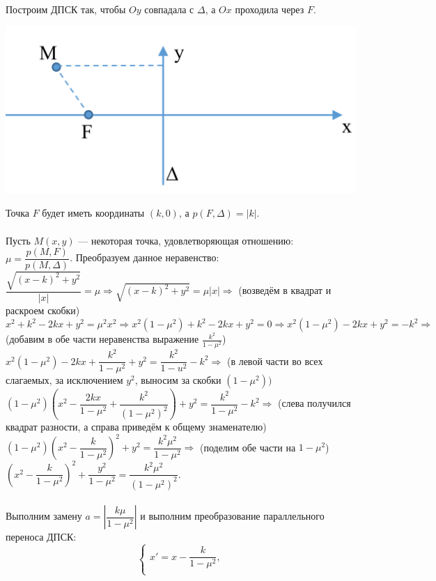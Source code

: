 \begin{Proof}
	Построим ДПСК так, чтобы $Oy$
	совпадала с $\Delta$, а $Ox$ проходила через $F$.
	\begin{center}\includegraphics[scale=0.4]{images/exc2.png}\end{center}
	Точка $F$ будет иметь координаты $(k, 0)$, а $p(F, \Delta) = |k|$.\\\\
	Пусть $M(x, y)$ --- некоторая точка, удовлетворяющая
	отношению: $\mu = \dfrac{p(M,F)}{p(M,\Delta)}$. Преобразуем данное неравенство:
	$\dfrac{\sqrt{(x-k)^2+y^2}}{|x|} = \mu \Rightarrow \sqrt{(x-k)^2 + y^2} = \mu |x| \Rightarrow$ (возведём в квадрат и раскроем скобки) $x^2 + k^2 - 2kx + y^2 = \mu^2 x^2 \Rightarrow x^2(1 - \mu^2) + k^2 - 2kx + y^2 = 0 \Rightarrow
	x^2(1 - \mu^2) - 2kx + y^2 = -k^2 \Rightarrow$ (добавим в обе части неравенства выражение $\frac{k^2}{1-\mu^2}$)\\
	$x^2(1-\mu^2) - 2kx + \dfrac{k^2}{1-\mu^2} + y^2 = \dfrac{k^2}{1-u^2} - k^2 \Rightarrow$ (в левой части во всех слагаемых, за исключением $y^2$, выносим за скобки $(1-\mu^2))$\\
	$(1-\mu^2)(x^2 - \dfrac{2kx}{1-\mu^2} + \dfrac{k^2}{(1-\mu^2)^2}) + y^2 = \dfrac{k^2}{1-\mu^2} - k^2 \Rightarrow$ (слева получился квадрат разности, а справа приведём к общему знаменателю)\\
	$(1-\mu^2)(x^2 - \dfrac{k}{1-\mu^2})^2 + y^2 = \dfrac{k^2\mu^2}{1-\mu^2} \Rightarrow $ (поделим обе части на $1-\mu^2$)\\
	$(x^2- \dfrac{k}{1-\mu^2})^2 + \dfrac{y^2}{1-\mu^2} = \dfrac{k^2\mu^2}{(1-\mu^2)^2}.$\\\\
	Выполним замену $a = |\dfrac{k\mu}{1-\mu^2}|$ и выполним преобразование параллельного переноса ДПСК:\\
	$$\begin{cases}
		x'= x - \dfrac{k}{1-\mu^2},\\

\end{cases}$$
\end{Proof}
